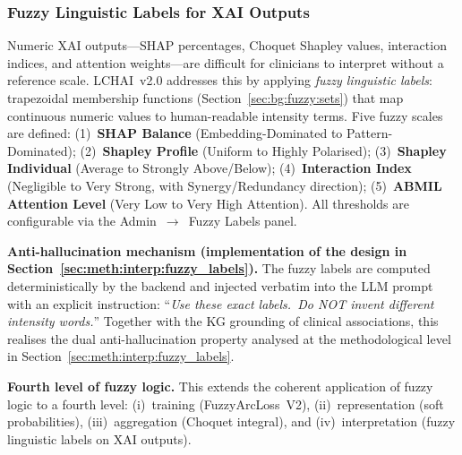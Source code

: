 \subsubsection{Fuzzy Linguistic Labels for XAI Outputs}
\label{sec:impl:lchai:fuzzy_labels}

Numeric XAI outputs---SHAP percentages, Choquet Shapley values,
interaction indices, and attention weights---are difficult for clinicians
to interpret without a reference scale.
LCHAI~v2.0 addresses this by applying \emph{fuzzy linguistic labels}:
trapezoidal membership functions (Section~\ref{sec:bg:fuzzy:sets}) that
map continuous numeric values to human-readable intensity terms.
Five fuzzy scales are defined:
(1)~\textbf{SHAP Balance} (Embedding-Dominated to Pattern-Dominated);
(2)~\textbf{Shapley Profile} (Uniform to Highly Polarised);
(3)~\textbf{Shapley Individual} (Average to Strongly Above/Below);
(4)~\textbf{Interaction Index} (Negligible to Very Strong, with Synergy/Redundancy direction);
(5)~\textbf{ABMIL Attention Level} (Very Low to Very High Attention).
All thresholds are configurable via the Admin~$\to$~Fuzzy Labels panel.

\textbf{Anti-hallucination mechanism (implementation of the design in
Section~\ref{sec:meth:interp:fuzzy_labels}).}
The fuzzy labels are computed deterministically by the backend and
injected verbatim into the LLM prompt with an explicit instruction:
``\emph{Use these exact labels.\ Do NOT invent different intensity
words.}''
Together with the KG grounding of clinical associations, this
realises the dual anti-hallucination property analysed at the
methodological level in Section~\ref{sec:meth:interp:fuzzy_labels}.

\textbf{Fourth level of fuzzy logic.}
This extends the coherent application of fuzzy logic to a fourth level:
(i)~training (FuzzyArcLoss~V2), (ii)~representation (soft probabilities),
(iii)~aggregation (Choquet integral), and (iv)~interpretation (fuzzy
linguistic labels on XAI outputs).

